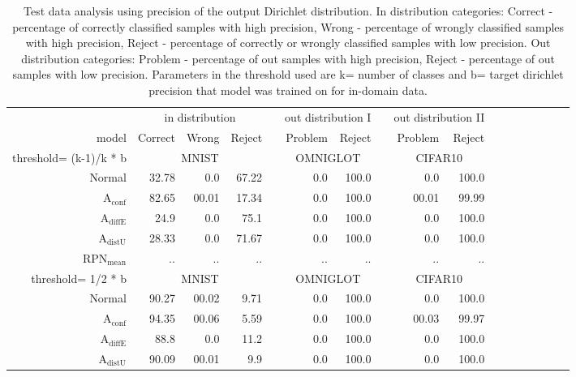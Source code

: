 \begin{table}[ht]
	\centering
	\caption{Test data analysis using precision of the output Dirichlet distribution. In distribution categories: Correct - percentage of correctly classified samples with high precision,
	Wrong - percentage of wrongly classified samples with high precision, Reject - percentage of correctly or wrongly classified samples with low precision. Out distribution categories:
	Problem - percentage of out samples with high precision, Reject - percentage of out samples with low precision. Parameters in the threshold used are k= number of classes and
	b= target dirichlet precision that model was trained on for in-domain data. }
	\begin{tiny}
        \begin{tabular}{@{}rrrrrrrcrrrrcrrrr@{}}
        \toprule
		& \multicolumn{3}{c}{in distribution} & & \multicolumn{2}{c}{out distribution I} & & \multicolumn{2}{c}{out distribution II} \\
		model & Correct & Wrong & Reject & &  Problem & Reject &  & Problem & Reject \\
        \midrule
		threshold= (k-1)/k * b & \multicolumn{3}{c}{MNIST} & & \multicolumn{2}{c}{OMNIGLOT} & & \multicolumn{2}{c}{CIFAR10} \\
		Normal & 32.78 & 0.0 & 67.22 & & 0.0 & 100.0 && 0.0 & 100.0 \\
		$\mathrm{A}_{\mathrm{conf}}$ & 82.65 & 00.01 & 17.34 && 0.0 & 100.0 && 00.01 & 99.99 \\
		$\mathrm{A}_{\mathrm{diffE}}$ & 24.9 & 0.0 & 75.1 & & 0.0 & 100.0 & & 0.0 & 100.0 \\  
		$\mathrm{A}_{\mathrm{distU}}$ & 28.33 & 0.0 & 71.67 & & 0.0 & 100.0 & & 0.0 & 100.0 \\
		$\mathrm{RPN}_{\mathrm{mean}}$ & .. & .. & .. & & .. & .. & & .. & .. \\
		\midrule
		threshold= 1/2 * b & \multicolumn{3}{c}{MNIST} & & \multicolumn{2}{c}{OMNIGLOT} & & \multicolumn{2}{c}{CIFAR10} \\
		Normal & 90.27 & 00.02 & 9.71 & & 0.0 & 100.0 && 0.0 & 100.0 \\
		$\mathrm{A}_{\mathrm{conf}}$ & 94.35 & 00.06 & 5.59 && 0.0 & 100.0 && 00.03 & 99.97 \\
		$\mathrm{A}_{\mathrm{diffE}}$ & 88.8 & 0.0 & 11.2 & & 0.0 & 100.0 & & 0.0 & 100.0 \\  
		$\mathrm{A}_{\mathrm{distU}}$ & 90.09 & 00.01 & 9.9 & & 0.0 & 100.0 & & 0.0 & 100.0 \\

\end{tabular}
\end{tiny}
\end{table}
